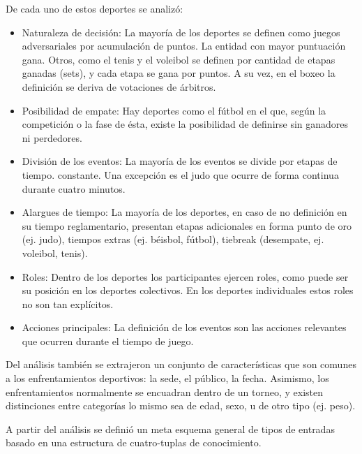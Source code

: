     De cada uno de estos deportes se analizó:

    \begin{itemize}
        \item Naturaleza de decisión: La mayoría de los deportes se definen como juegos 
        adversariales por acumulación de puntos. La entidad con mayor puntuación gana. Otros, como el tenis y el voleibol 
        se definen por cantidad de etapas ganadas (sets), y cada etapa se gana por puntos. A su vez, en el boxeo la definición 
        se deriva de votaciones de árbitros.
        \item Posibilidad de empate: Hay deportes como el fútbol en el que, según la competición o la fase de ésta, existe la posibilidad de 
        definirse sin ganadores ni perdedores.
        \item División de los eventos: La mayoría de los eventos se divide por etapas de tiempo.
        constante. Una excepción es el judo que ocurre de forma continua durante cuatro minutos. 
        \item Alargues de tiempo: La mayoría de los deportes, en caso de no definición en su tiempo reglamentario, presentan 
        etapas adicionales en forma punto de oro (ej. judo),  tiempos extras (ej. béisbol, fútbol), tiebreak (desempate, ej. voleibol, tenis).
        \item Roles: Dentro de los deportes los participantes ejercen roles, como puede ser su posición en los deportes colectivos. En los deportes 
        individuales estos roles no son tan explícitos.
        \item  Acciones principales: La definición de los eventos son las acciones relevantes que ocurren durante el tiempo de juego.
    \end{itemize}

    Del análisis también se extrajeron un conjunto de características que son comunes a los enfrentamientos deportivos: la sede, 
el público, la fecha. Asimismo, los enfrentamientos normalmente se encuadran dentro de un torneo, y existen distinciones entre categorías lo mismo sea 
de edad, sexo, u de otro tipo (ej. peso).

    A partir del análisis se definió un meta esquema general de tipos de entradas basado en una estructura de 
cuatro-tuplas de conocimiento.

